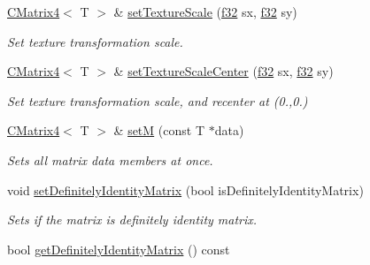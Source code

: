 \begin{DoxyCompactItemize}
\hyperlink{classirr_1_1core_1_1CMatrix4}{C\+Matrix4}$<$ T $>$ \& \hyperlink{classirr_1_1core_1_1CMatrix4_aed32a7a8da9c4cee5babe8f6b4aa7dd4}{set\+Texture\+Scale} (\hyperlink{namespaceirr_a0277be98d67dc26ff93b1a6a1d086b07}{f32} sx, \hyperlink{namespaceirr_a0277be98d67dc26ff93b1a6a1d086b07}{f32} sy)
\begin{DoxyCompactList}\small\item\em Set texture transformation scale. \end{DoxyCompactList}\item 
\hyperlink{classirr_1_1core_1_1CMatrix4}{C\+Matrix4}$<$ T $>$ \& \hyperlink{classirr_1_1core_1_1CMatrix4_adbd668867d117dc9331e68abef0af221}{set\+Texture\+Scale\+Center} (\hyperlink{namespaceirr_a0277be98d67dc26ff93b1a6a1d086b07}{f32} sx, \hyperlink{namespaceirr_a0277be98d67dc26ff93b1a6a1d086b07}{f32} sy)
\begin{DoxyCompactList}\small\item\em Set texture transformation scale, and recenter at (0.,0.) \end{DoxyCompactList}\item 
\hyperlink{classirr_1_1core_1_1CMatrix4}{C\+Matrix4}$<$ T $>$ \& \hyperlink{classirr_1_1core_1_1CMatrix4_ae59fb2248865eba3026d13b9756ba1e1}{setM} (const T $\ast$data)\hypertarget{classirr_1_1core_1_1CMatrix4_ae59fb2248865eba3026d13b9756ba1e1}{}\label{classirr_1_1core_1_1CMatrix4_ae59fb2248865eba3026d13b9756ba1e1}

\begin{DoxyCompactList}\small\item\em Sets all matrix data members at once. \end{DoxyCompactList}\item 
void \hyperlink{classirr_1_1core_1_1CMatrix4_a87f7195337a2bf7a49978c2ec1100c0a}{set\+Definitely\+Identity\+Matrix} (bool is\+Definitely\+Identity\+Matrix)\hypertarget{classirr_1_1core_1_1CMatrix4_a87f7195337a2bf7a49978c2ec1100c0a}{}\label{classirr_1_1core_1_1CMatrix4_a87f7195337a2bf7a49978c2ec1100c0a}

\begin{DoxyCompactList}\small\item\em Sets if the matrix is definitely identity matrix. \end{DoxyCompactList}\item 
bool \hyperlink{classirr_1_1core_1_1CMatrix4_ab91cb550bdacbc7b79a47d5b4ee5f4fa}{get\+Definitely\+Identity\+Matrix} () const \hypertarget{classirr_1_1core_1_1CMatrix4_ab91cb550bdacbc7b79a47d5b4ee5f4fa}{}\label{classirr_1_1core_1_1CMatrix4_ab91cb550bdacbc7b79a47d5b4ee5f4fa}


\end{DoxyCompactItemize}
